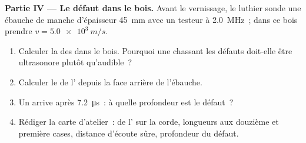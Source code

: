\begin{problem}
\medskip
\noindent\textbf{Partie IV --- Le défaut dans le bois.}
Avant le vernissage, le luthier sonde une ébauche de manche d'épaisseur
\qty{45}{mm} avec un testeur à \qty{2.0}{MHz}~; dans ce bois prendre
$v = \qty{5.0e3}{m/s}$.
\begin{enumerate}[resume]
  \item Calculer la  des
         dans le bois. Pourquoi une
         chassant les défauts doit-elle être ultrasonore plutôt
        qu'audible~?
  \item Calculer le  de l' depuis la face
        arrière de l'ébauche.
  \item Un  arrive après \qty{7.2}{\micro s}~: à quelle
        profondeur est le défaut~?
  \item Rédiger la carte d'atelier~:  de l' sur la
        corde, longueurs aux douzième et première cases, distance
        d'écoute sûre, profondeur du défaut.
\end{enumerate}
\end{problem}
